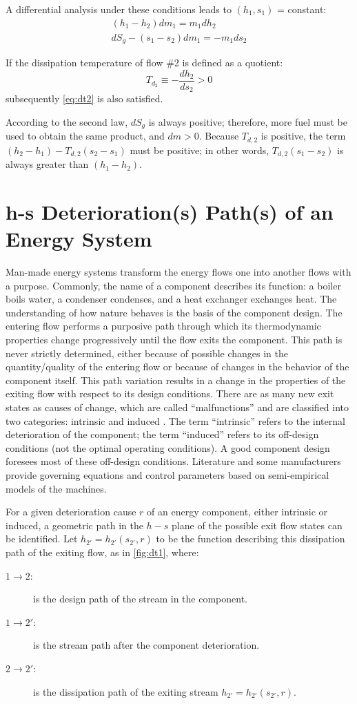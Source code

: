 \documentclass[energies,article,submit,moreauthors,pdftex]{Definitions/mdpi}
\begin{document}
A differential analysis under these conditions leads to $(h_1,s_1)$ = constant:
\begin{align}
\left(h_1 - h_2\right) dm_1 = m_1 dh_2 \\
dS_g - \left(s_1 - s_2\right) dm_1 = - m_1 ds_2 
\end{align}

If the dissipation temperature of flow \#2 is defined as a quotient:
\[
	T_{d_2}\equiv -\frac{dh_2}{ds_2}>0
\]
subsequently \cref{eq:dt2} is also satisfied.

According to the second law, $dS_g$ is always positive; therefore, more fuel must be used to obtain the same product, and $dm > 0$. Because $T_{d,2}$ is positive, the term $(h_2-h_1 )-T_{d,2} (s_2-s_1 )$ must be positive; in other words, $T_{d,2} (s_1-s_2)$ is always greater than $(h_1-h_2)$.

\section{h-s Deterioration(s) Path(s) of an Energy System}
Man-made energy systems transform the energy flows one into another flows with a purpose. Commonly, the name of a component describes its function: a boiler boils water, a condenser condenses, and a heat exchanger exchanges heat. The understanding of how nature behaves is the basis of the component design. The entering flow performs a purposive path through which its thermodynamic properties change progressively until the flow exits the component. This path is never strictly determined, either because of possible changes in the quantity/quality of the entering flow or because of changes in the behavior of the component itself. This path variation results in a change in the properties of the exiting flow with respect to its design conditions. There are as many new exit states as causes of change, which are called “malfunctions” and are classified into two categories: intrinsic and induced \cite{Valero2004c,Valero1999c,Torres1999}. The term “intrinsic” refers to the internal deterioration of the component; the term “induced” refers to its off-design conditions (not the optimal operating conditions). A good component design foresees most of these off-design conditions. Literature and some manufacturers provide governing equations and control parameters based on semi-empirical models of the machines.

For a given deterioration cause $r$ of an energy component, either intrinsic or induced, a geometric path in the $h-s$ plane of the possible exit flow states can be identified. Let $h_{2'}=h_{2'}(s_{2'}, r)$ to be the function describing this dissipation path of the exiting flow, as in \cref{fig:dt1}, where:
\begin{description}
	\item[$1 \longrightarrow 2:$]  is the design path of the stream in the component.
	\item[$1 \longrightarrow 2':$] is the stream path after the component deterioration.
	\item[$2 \longrightarrow 2':$] is the dissipation path of the exiting stream $h_{2'} = h_{2'} (s_{2'}, r).$
\end{description}
\end{document}
